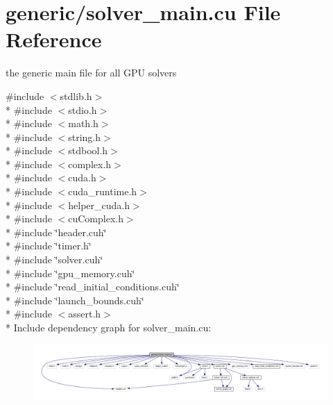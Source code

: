 \hypertarget{solver__main_8cu}{}\section{generic/solver\+\_\+main.cu File Reference}
\label{solver__main_8cu}


the generic main file for all G\+PU solvers  


{\ttfamily \#include $<$stdlib.\+h$>$}\\*
{\ttfamily \#include $<$stdio.\+h$>$}\\*
{\ttfamily \#include $<$math.\+h$>$}\\*
{\ttfamily \#include $<$string.\+h$>$}\\*
{\ttfamily \#include $<$stdbool.\+h$>$}\\*
{\ttfamily \#include $<$complex.\+h$>$}\\*
{\ttfamily \#include $<$cuda.\+h$>$}\\*
{\ttfamily \#include $<$cuda\+\_\+runtime.\+h$>$}\\*
{\ttfamily \#include $<$helper\+\_\+cuda.\+h$>$}\\*
{\ttfamily \#include $<$cu\+Complex.\+h$>$}\\*
{\ttfamily \#include \char`\"{}header.\+cuh\char`\"{}}\\*
{\ttfamily \#include \char`\"{}timer.\+h\char`\"{}}\\*
{\ttfamily \#include \char`\"{}solver.\+cuh\char`\"{}}\\*
{\ttfamily \#include \char`\"{}gpu\+\_\+memory.\+cuh\char`\"{}}\\*
{\ttfamily \#include \char`\"{}read\+\_\+initial\+\_\+conditions.\+cuh\char`\"{}}\\*
{\ttfamily \#include \char`\"{}launch\+\_\+bounds.\+cuh\char`\"{}}\\*
{\ttfamily \#include $<$assert.\+h$>$}\\*
Include dependency graph for solver\+\_\+main.\+cu\+:\nopagebreak
\begin{figure}[H]
\begin{center}
\leavevmode
\includegraphics[width=350pt]{solver__main_8cu__incl}
\end{center}
\end{figure}
